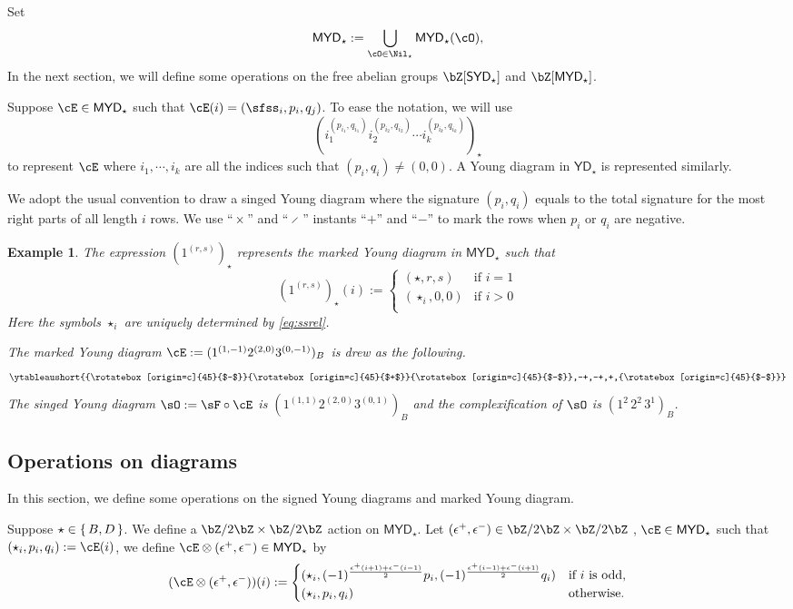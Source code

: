 \documentclass[12pt,a4paper]{amsart}
\def\YD{{\mathsf{YD}}}
\def\SYD{{\mathsf{SYD}}}
\def\MYD{{\mathsf{MYD}}}
\def\lotimes{\otimes}
\numberwithin{equation}{section}
\newtheorem{eg}[thm]{Example}
\theoremstyle{remark}
\let\ytb=\ytableaushort
\def\upp{{\rotatebox[origin=c]{45}{$+$}}}
\def\umm{{\rotatebox[origin=c]{45}{$-$}}}
\begin{document}
Set
\[
  \MYD_{\star} := \bigcup_{\cO\in \Nil_{\star}}\MYD_{\star}(\cO),
\]
In the next section, we will define some operations on the  free abelian groups
$\bZ[\SYD_{\star}]$ and $\bZ[\MYD_{\star}]$.

\smallskip

Suppose $\cE\in \MYD_{\star}$ such that $\cE(i)=(\sfss_{i},p_{i},q_{j})$.
To ease the notation, we will use
\[
  ( i_{1}^{(p_{i_{1}},q_{i_{1}})}i_{2}^{(p_{i_{2}},q_{i_{2}})}\cdots i_{k}^{(p_{i_{k}},q_{i_{k}})} )_{\star}
\]
to represent $\cE$ where
$i_{1},\cdots, i_{k}$ are all the indices such that $(p_{i},q_{i})\neq (0,0)$.
A Young diagram in $\YD_{\star}$ is represented similarly.

We adopt the usual convention to draw a singed Young diagram where the signature
$(p_{i}, q_{i})$ equals to the total signature for the most right parts of all
length $i$ rows.
We use ``$\upp$'' and ``$\umm$'' instants ``$+$'' and ``$-$'' to mark the rows
when $p_{i}$ or $q_{i}$ are negative.

\begin{eg}\label{eg:MYD}
The expression $(1^{(r,s)})_{\star}$ represents the marked Young diagram in $\MYD_{\star}$ such that
 \[
   (1^{(r,s)})_{\star}(i) := \begin{cases}
     (\star,r,s) & \text{if } i=1\\
     (\star_{i},0,0) & \text{if $i>0$}\\
   \end{cases}
 \]
 Here the symbols $\star_{i}$ are uniquely determined by \eqref{eq:ssrel}.

The marked Young diagram  $\cE:=(1^{(1,-1)}2^{(2,0)}3^{(0,-1)})_{B}$ is drew as the
following.
\[
  \ytb{\umm\upp\umm,-+,-+,+,\umm}
\]
The singed Young diagram $\sO:=\sF\circ \cE$ is
$(1^{(1,1)}2^{(2,0)}3^{(0,1)})_{B}$ and the complexification of $\sO$
is $(1^{2}\,2^{2}\,3^{1})_{B}$.
\end{eg}

\subsection{Operations on diagrams}
In this section, we define some operations on the signed Young diagrams and
marked Young diagram.

Suppose $\star\in \set{B,D}$.
We define a $\bZ/2\bZ\times \bZ/2\bZ$ action on $\MYD_{\star}$.
Let $(\epsilon^{+},\epsilon^{-})\in \bZ/2\bZ\times \bZ/2\bZ$ , $\cE\in \MYD_{\star}$ such that $(\star_{i},p_{i},q_{i}):=\cE(i)$,
we define $\cE \lotimes (\epsilon^{+},\epsilon^{-})\in \MYD_{\star}$ by
\[
(\cE \lotimes(\epsilon^{+},\epsilon^{-}))(i) := \begin{cases}
  (\star_{i}, (-1)^{\frac{\epsilon^{+}(i+1)+\epsilon^{-}(i-1)}{2}}p_{i},(-1)^{\frac{\epsilon^{+}(i-1)+\epsilon^{-}(i+1)}{2}}q_{i})
  & \text{if $i$  is odd,}\\
  (\star_{i}, p_{i},q_{i}) & \text{otherwise.}
\end{cases}
\]
\end{document}
